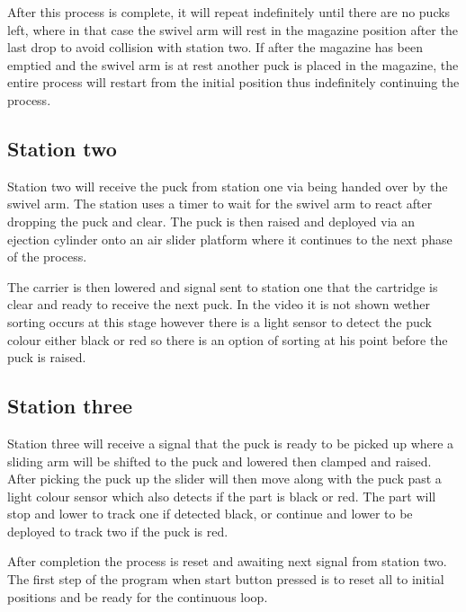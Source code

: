 \documentclass[a4paper, 10pt,  conference]{article}
\begin{document}
After this process is complete, it will repeat indefinitely until there are no pucks left, where in that case the swivel arm will rest in the magazine position after the last drop to avoid collision with station two. If after the magazine has been emptied and the swivel arm is at rest another puck is placed in the magazine, the entire process will restart from the initial position thus indefinitely continuing the process.



\subsection{Station two}
Station two will receive the puck from station one via being handed over by the swivel arm. The station uses a timer to wait for the swivel arm to react after dropping the puck and clear. The puck is then raised and deployed via an ejection cylinder onto an air slider platform where it continues to the next phase of the process.

The carrier is then lowered and signal sent to station one that the cartridge is clear and ready to receive the next puck. In the video it is not shown wether sorting occurs at this stage however there is a light sensor to detect the puck colour either black or red so there is an option of sorting at his point before the puck is raised.



\subsection{Station three}
Station three will receive a signal that the puck is ready to be picked up where a sliding arm will be shifted to the puck and lowered then clamped and raised. After picking the puck up the slider will then move along with the puck past a light colour sensor which also detects if the part is black or red. The part will stop and lower to track one if detected black, or continue and lower to be deployed to track two if the puck is red.

After completion the process is reset and awaiting next signal from station two. The first step of the program when start button pressed is to reset all to initial positions and be ready for the continuous loop.


\end{document}
